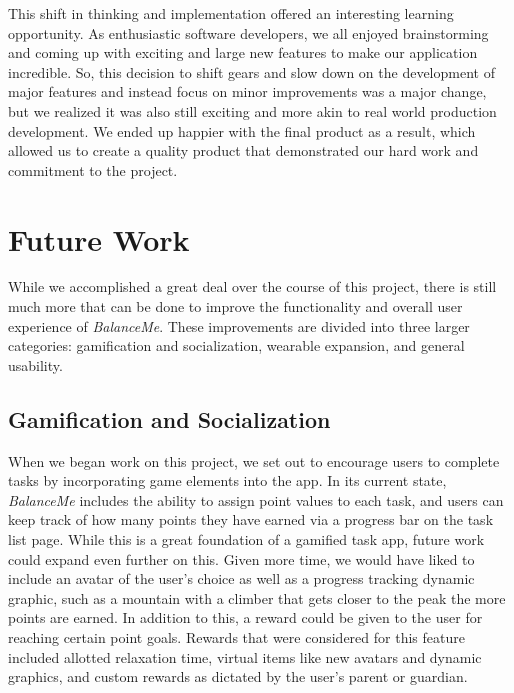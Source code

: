\documentclass{sigchi}
\begin{document}
This shift in thinking and implementation offered an interesting learning
opportunity. As enthusiastic software developers, we all enjoyed brainstorming
and coming up with exciting and large new features to make our application
incredible. So, this decision to shift gears and slow down on the development
of major features and instead focus on minor improvements was a major change,
but we realized it was also still exciting and more akin to real world
production development. We ended up happier with the final product as a result,
which allowed us to create a quality product that demonstrated our hard work
and commitment to the project.


\section{Future Work}


While we accomplished a great deal over the course of this project, there is
still much more that can be done to improve the functionality and overall user
experience of \textit{BalanceMe}. These improvements are divided into three
larger categories: gamification and socialization, wearable expansion, and
general usability.

\subsection{Gamification and Socialization}

When we began work on this project, we set out to encourage users to complete
tasks by incorporating game elements into the app. In its current state,
\textit{BalanceMe} includes the ability to assign point values to each task,
and users can keep track of how many points they have earned via a progress bar
on the task list page. While this is a great foundation of a gamified task app,
future work could expand even further on this. Given more time, we would have
liked to include an avatar of the user’s choice as well as a progress tracking
dynamic graphic, such as a mountain with a climber that gets closer to the peak
the more points are earned. In addition to this, a reward could be given to the
user for reaching certain point goals. Rewards that were considered for this
feature included allotted relaxation time, virtual items like new avatars and
dynamic graphics, and custom rewards as dictated by the user’s parent or
guardian.
\end{document}
